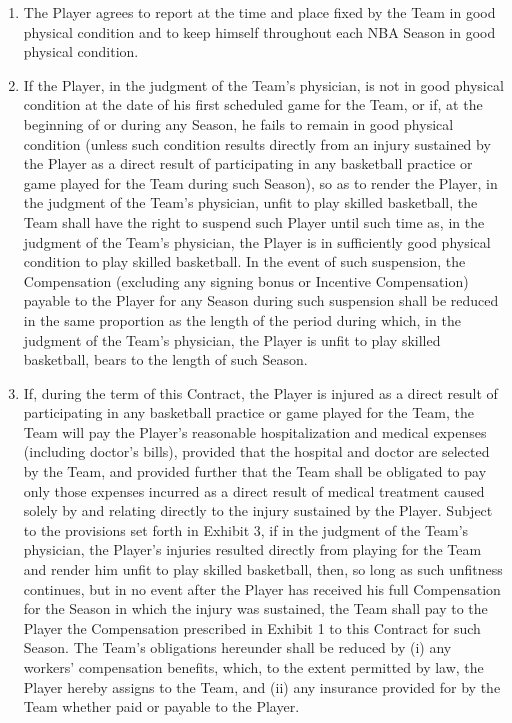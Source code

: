 \documentclass[
]{book}
\providecommand{\tightlist}{%
  \setlength{\itemsep}{0pt}\setlength{\parskip}{0pt}}
\begin{document}
\begin{enumerate}
\def\labelenumi{(\alph{enumi})}
\tightlist
\item
  The Player agrees to report at the time and place fixed by the Team in good physical condition and to keep himself throughout each NBA Season in good physical condition.
\item
  If the Player, in the judgment of the Team's physician, is not in good physical condition at the date of his first scheduled game for the Team, or if, at the beginning of or during any Season, he fails to remain in good physical condition (unless such condition results directly from an injury sustained by the Player as a direct result of participating in any basketball practice or game played for the Team during such Season), so as to render the Player, in the judgment of the Team's physician, unfit to play skilled basketball, the Team shall have the right to suspend such Player until such time as, in the judgment of the Team's physician, the Player is in sufficiently good physical condition to play skilled basketball. In the event of such suspension, the Compensation (excluding any signing bonus or Incentive Compensation) payable to the Player for any Season during such suspension shall be reduced in the same proportion as the length of the period during which, in the judgment of the Team's physician, the Player is unfit to play skilled basketball, bears to the length of such Season.
\item
  If, during the term of this Contract, the Player is injured as a direct result of participating in any basketball practice or game played for the Team, the Team will pay the Player's reasonable hospitalization and medical expenses (including doctor's bills), provided that the hospital and doctor are selected by the Team, and provided further that the Team shall be obligated to pay only those expenses incurred as a direct result of medical treatment caused solely by and relating directly to the injury sustained by the Player. Subject to the provisions set forth in Exhibit 3, if in the judgment of the Team's physician, the Player's injuries resulted directly from playing for the Team and render him unfit to play skilled basketball, then, so long as such unfitness continues, but in no event after the Player has received his full Compensation for the Season in which the injury was sustained, the Team shall pay to the Player the Compensation prescribed in Exhibit 1 to this Contract for such Season. The Team's obligations hereunder shall be reduced by (i) any workers' compensation benefits, which, to the extent permitted by law, the Player hereby assigns to the Team, and (ii) any insurance provided for by the Team whether paid or payable to the Player.

\end{enumerate}
\end{document}
